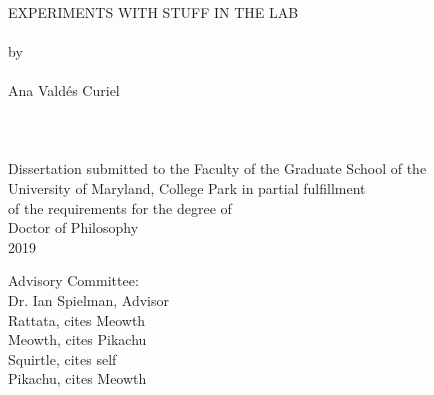 
\thispagestyle{empty}
\hbox{\ }
\vspace{1in}
\renewcommand{\baselinestretch}{1}
\small\normalsize
\begin{center}

\large{{EXPERIMENTS WITH STUFF IN THE LAB}}
\ \\
\ \\
\large{by} \\
\ \\
\large{Ana Vald\'es Curiel}%
\ \\
\ \\
\ \\
\ \\
\normalsize
Dissertation submitted to the Faculty of the Graduate School of the \\
University of Maryland, College Park in partial fulfillment \\
of the requirements for the degree of \\
Doctor of Philosophy \\
2019
\end{center}

\vspace{7.5em}

\noindent Advisory Committee: \\
Dr. Ian Spielman, Advisor \\
Rattata, cites Meowth \\
Meowth, cites Pikachu \\
Squirtle, cites self \\
Pikachu, cites Meowth
